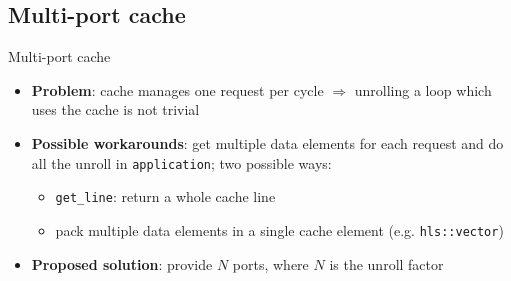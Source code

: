 \documentclass{beamer}
\begin{document}
\subsection{Multi-port cache}
\begin{frame}{Multi-port cache}
	\begin{itemize}[<+->]
		\item \textbf{Problem}: cache manages one request per cycle
			$\Rightarrow$ unrolling a loop which uses the cache is not
			trivial
		\item \textbf{Possible workarounds}:
			get multiple data elements for each request and do all
			the unroll in \texttt{application}; two possible ways:
			\begin{itemize}[<.->]
				\item \texttt{get\_line}: return a whole cache
					line
				\item pack multiple data elements in a single
					cache element (e.g. \texttt{hls::vector})
			\end{itemize}
		\item \textbf{Proposed solution}: provide $N$ ports, where $N$ is
			the unroll factor
	\end{itemize}
\end{frame}
\end{document}
